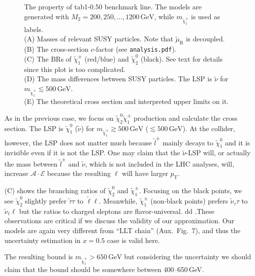 \documentclass[a4paper,10pt,captions=tableheading,DIV=14]{scrartcl}
\numberwithin{equation}{section}
\newcommand\w[1]{_{\mathrm{#1}}}
\newcommand\unit[1]{\,\mathrm{#1}\xspace}
\newcommand\GeV{\unit{GeV}}
\newcommand\neut  [1][\relax]{{\tilde\chi^0_{#1}}}
\newcommand\charPM[1][\relax]{{\tilde\chi^\pm_{#1}}}
\begin{document}
\begin{figure}[h]
  \caption{\label{fig:tab1x005}The property of tab1-0.50 benchmark line. The models are generated with $M_2=200,250,\dots,1200\GeV$, while $m_{\charPM[1]}$ is used as labels.\\
 (A) Masses of relevant SUSY particles. Note that $\tilde\mu\w R$ is decoupled.\\
 (B) The cross-section $c$-factor (see \texttt{analysis.pdf}).\\
 (C) The BRs of $\charPM[1]$ (red/blue) and $\neut[2]$ (black). See text for details since this plot is too complicated.\\
 (D) The mass differences between SUSY particles. The LSP is  $\tilde\nu$ for $m_{\charPM[1]}\lesssim 500\GeV$.\\
 (E) The theoretical cross section and interpreted upper limits on it.
}
\end{figure}


As in the previous case, we focus on $\neut[2]\charPM[1]$ production and calculate the cross section.
The LSP is $\neut[1]$ ($\tilde\nu$) for $m_{\charPM[1]}\gtrsim500\GeV$ ($\lesssim500\GeV$).
At the collider, however, the LSP does not matter much because $\tilde l^\pm$ mainly decays to $\neut[1]$ and it is invisible even if it is not the LSP.
One may claim that the $\tilde\nu$-LSP will, or actually the mass between $\tilde l^\pm$ and $\tilde\nu$, which is not included in the LHC analyses, will, increase $\mathcal A\cdot\mathcal E$ because the resulting $\ell$ will have larger $p\w T$.

 (C) shows the branching ratios of $\neut[2]$ and $\charPM[1]$.
Focusing on the black points, we see $\neut[2]$ slightly prefer $\tilde\tau\tau$ to $\tilde\ell\ell$.
Meanwhile, $\charPM[1]$ (non-black points) prefers $\tilde\nu_\tau\tau$ to $\tilde\nu_\ell\ell$ but the ratios to charged sleptons are flavor-universal.
dd .These observations are critical if we discuss the validity of our approximation.
Our models are again very different from ``LLT chain'' (Aux.~Fig.~7), and thus the uncertainty estimation in $x=0.5$ case is valid here.

The resulting bound is $m_{\charPM[1]}>650\GeV$ but considering the uncertainty we should claim that the bound should be somewhere between 400--650\,GeV.
\end{document}
